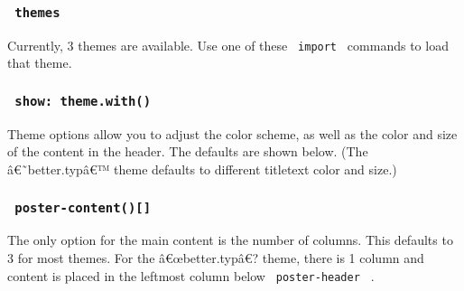 \subsubsection{\texorpdfstring{\texttt{\ themes\ }}{ themes }}\label{themes}

Currently, 3 themes are available. Use one of these \texttt{\ import\ }
commands to load that theme.

\begin{Shaded}
\begin{Highlighting}[]
\end{Highlighting}
\end{Shaded}

\subsubsection{\texorpdfstring{\texttt{\ show:\ theme.with()\ }}{ show: theme.with() }}\label{show-theme.with}

Theme options allow you to adjust the color scheme, as well as the color
and size of the content in the header. The defaults are shown below.
(The â€˜better.typâ€™ theme defaults to different titletext color and
size.)

\begin{Shaded}
\begin{Highlighting}[]
\NormalTok{)}
\end{Highlighting}
\end{Shaded}

\subsubsection{\texorpdfstring{\texttt{\ poster-content(){[}{]}\ }}{ poster-content(){[}{]} }}\label{poster-content}

The only option for the main content is the number of columns. This
defaults to 3 for most themes. For the â€œbetter.typâ€? theme, there is
1 column and content is placed in the leftmost column below
\texttt{\ poster-header\ } .

\begin{Shaded}
\begin{Highlighting}[]
\NormalTok{\#poster{-}content(col: 3)[}
\NormalTok{]}
\end{Highlighting}
\end{Shaded}

